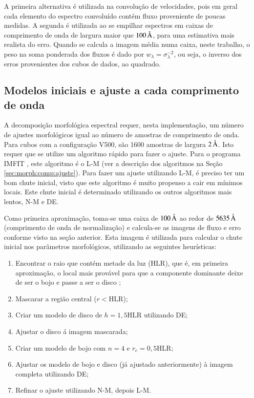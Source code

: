 A primeira alternativa é utilizada na convolução de velocidades, pois em geral
cada elemento do espectro convoluído contém fluxo proveniente de poucas medidas.
A segunda é utilizada ao se empilhar espectros em caixas de comprimento de onda
de largura maior que $100\,\text{\normalfont\AA}$, para uma estimativa mais realista do
erro. Quando se calcula a imagem média numa caixa, neste trabalho, o peso na
soma ponderada dos fluxos é dado por $w_\lambda = \sigma_\lambda^{-2}$, ou seja,
o inverso dos erros provenientes dos cubos de dados, ao quadrado.


\subsection{Modelos iniciais e ajuste a cada comprimento de onda}
\label{sec:Decomp:initmodel}

A decomposição morfológica espectral requer, nesta implementação, um número de
ajustes morfológicos igual ao número de amostras de comprimento de onda. Para
cubos com a configuração V500, são 1600 amostras de largura $2\,\text{\normalfont\AA}$. Isto
requer que se utilize um algoritmo rápido para fazer o ajuste. Para o programa
IMFIT \citep{Erwin2015}, este algoritmo é o L-M (ver a descrição dos algoritmos
na Seção \ref{sec:morph:comp:ajuste}). Para fazer um ajuste utilizando L-M, é
preciso ter um bom chute inicial, visto que este algoritmo é muito propenso a
cair em mínimos locais. Este chute inicial é determinado utilizando os outros
algoritmos mais lentos, N-M e DE.

Como primeira aproximação, toma-se uma caixa de $100\,\text{\normalfont\AA}$ ao redor de
$5635\,\text{\normalfont\AA}$ (comprimento de onda de normalização) e calcula-se as imagens
de fluxo e erro conforme visto na seção anterior. Esta imagem é utilizada para
calcular o chute inicial nos parâmetros morfológicos, utilizando as seguintes
heurísticas:
\begin{enumerate}
  \item Encontrar o raio que contém metade da luz ($\mathrm{HLR}$), que é, em
  primeira aproximação, o local mais provável para que a componente dominante
  deixe de ser o bojo e passe a ser o disco \cite{GonzalezDelgado2015};
  \item Mascarar a região central ($r < \mathrm{HLR}$);
  \item Criar um modelo de disco de $h=1,5 \mathrm{HLR}$ utilizando DE;
  \item Ajustar o disco á imagem mascarada;
  \item Criar um modelo de bojo com $n = 4$ e $r_e = 0,5 \mathrm{HLR}$;
  \item Ajustar os modelo de bojo e disco (já ajustado anteriormente) à imagem
  completa utilizando DE;
  \item Refinar o ajuste utilizando N-M, depois L-M.
\end{enumerate}


